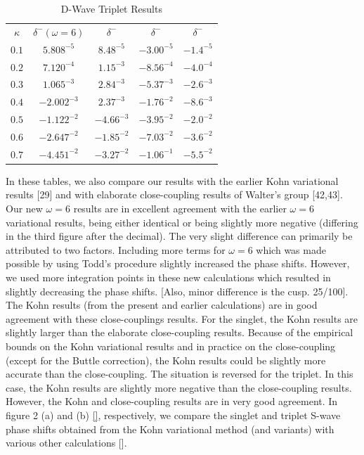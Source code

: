 \documentclass[preprint,showpacs,preprintnumbers,amsmath,amssymb]{revtex4}
\begin{document}
\begin{table}
\begin{center}
\begin{ruledtabular}
\begin{tabular}{c c c c c}
$\kappa$ & $\delta^- (\omega = 6)$ & $\delta^-$ \cite{Blackwood2002} & $\delta^-$ \cite{Ray1997} & $\delta^-$ \cite{Adhikari1999} \\
\colrule
$0.1$ & $5.808^{-5}$ & $8.48^{-5}$ & $-3.00^{-5}$ & $-1.4^{-5}$ \\
$0.2$ & $7.120^{-4}$ & $1.15^{-3}$ & $-8.56^{-4}$ & $-4.0^{-4}$ \\
$0.3$ & $1.065^{-3}$ & $2.84^{-3}$ & $-5.37^{-3}$ & $-2.6^{-3}$ \\
$0.4$ & $-2.002^{-3}$ & $2.37^{-3}$ & $-1.76^{-2}$ & $-8.6^{-3}$ \\
$0.5$ & $-1.122^{-2}$ & $-4.66^{-3}$ & $-3.95^{-2}$ & $-2.0^{-2}$ \\
$0.6$ & $-2.647^{-2}$ & $-1.85^{-2}$ & $-7.03^{-2}$ & $-3.6^{-2}$ \\
$0.7$ & $-4.451^{-2}$ & $-3.27^{-2}$ & $-1.06^{-1}$ & $-5.5^{-2}$ \\
\end{tabular}
\end{ruledtabular}
\caption{D-Wave Triplet Results}
\label{tab:DWaveTriplet}
\end{center}
\end{table}



In these tables, we also compare our results with the earlier Kohn
variational results [29] and with  elaborate
close-coupling results of Walter's group [42,43].
Our new $\omega=6$ results are in excellent agreement with 
the earlier $\omega =6$ variational results, being either identical or 
being  slightly more negative (differing in the third figure after
the decimal). 
The very slight difference can primarily
be attributed to two factors.
Including more terms for $\omega=6$ which was made possible
by using Todd's procedure slightly increased the phase shifts.
However, we used more integration points in these new
calculations which resulted in slightly decreasing
the phase shifts.
[Also, minor difference is the cusp. 25/100].
The Kohn results (from the present and earlier calculations) 
are in good agreement with these close-couplings results.
For the singlet, the Kohn results are slightly
larger than the elaborate close-coupling results.
Because of the empirical bounds on the
Kohn variational results and in practice on
the close-coupling (except for the Buttle
correction), the Kohn results could be
slightly more accurate than the close-coupling.
The situation is reversed for the triplet.
In this case, the Kohn results are slightly
more negative than the close-coupling results.
However, the Kohn and close-coupling results are
in very good agreement.
In figure 2 (a) and (b) \ref{}, respectively,
we compare the singlet and triplet
S-wave phase shifts obtained from the Kohn variational
method (and variants) with various other calculations [].
\end{document}
